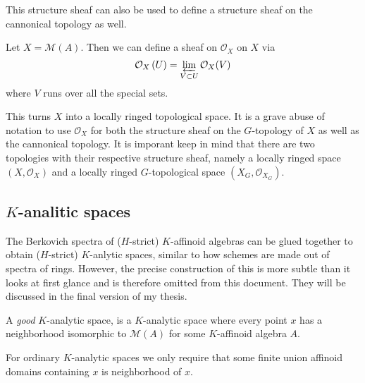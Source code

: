 This structure sheaf can also be used to define a structure sheaf on the cannonical topology as well. 
\begin{definition}
	Let $X = \mathcal{M} (A)$. Then we can define a sheaf on $\mathcal{O}_X$ on $X$ via \[
		\mathcal{O}_X\left( U \right)  = \varprojlim_{V \subset U} \mathcal{O}_X(V)
	\]   
	where $V$ runs over all the special sets.
\end{definition}
This turns $X$ into a locally ringed topological space. 
It is a grave abuse of notation to use $\mathcal{O}_X$ for both the structure sheaf on the $G$-topology of $X$ as well as the cannonical topology. 
It is imporant keep in mind that there are two topologies with their respective structure sheaf, namely a locally ringed space $(X, \mathcal{O}_X)$ and a locally ringed $G$-topological space $(X_G, \mathcal{O}_{X_G})$. 


\subsection{$K$-analitic spaces} \label{sec:k_analitic_spaces}

The Berkovich spectra of ($H$-strict) $K$-affinoid algebras can be glued together to obtain ($H$-strict) $K$-anlytic spaces, similar to how schemes are made out of spectra of rings. 
However, the precise construction of this is more subtle than it looks at first glance and is therefore omitted from this document. 
They will be discussed in the final version of my thesis. 

A \emph{good} $K $-analytic space, is a $K$-analytic space where every point $x$ has a neighborhood isomorphic to $\mathcal{M} (A)$ for some $K$-affinoid algebra $A$. 

For ordinary $K$-analytic spaces we only require that some finite union affinoid domains containing $x$ is neighborhood of $x$. 





